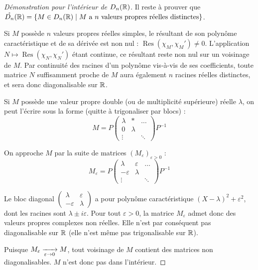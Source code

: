 \begin{proof}[Démonstration pour l'intérieur de $D_n(\mathbb{R})$]
    Il reste à prouver que $\mathring{D_n}(\mathbb{R}) = \{ M \in D_n(\mathbb{R}) \mid M \text{ a } n \text{ valeurs propres réelles distinctes} \}$.

    
    \svspace
    Si $M$ possède $n$ valeurs propres réelles simples, le résultant de son polynôme caractéristique et de sa dérivée est non nul : $\operatorname{Res}(\chi_M, \chi_M') \neq 0$.
    L'application $N \mapsto \operatorname{Res}(\chi_N, \chi_N')$ étant continue, ce résultant reste non nul sur un voisinage de $M$. Par continuité des racines d'un polynôme vis-à-vis de ses coefficients, toute matrice $N$ suffisamment proche de $M$ aura également $n$ racines réelles distinctes, et sera donc diagonalisable sur $\mathbb{R}$.
    
    
    \svspace
    Si $M$ possède une valeur propre double (ou de multiplicité supérieure) réelle $\lambda$, on peut l'écrire sous la forme (quitte à trigonaliser par blocs) :
    \[ M = P \begin{pmatrix} 
        \lambda & * & \dots \\ 
        0 & \lambda & \\ 
        \vdots & & \ddots 
    \end{pmatrix} P^{-1} \]
    
    On approche $M$ par la suite de matrices $(M_\varepsilon)_{\varepsilon > 0}$ :
    \[ M_\varepsilon = P \begin{pmatrix} 
        \lambda & \varepsilon & \dots \\ 
        -\varepsilon & \lambda & \\ 
        \vdots & & \ddots 
    \end{pmatrix} P^{-1} \]
    
    Le bloc diagonal $\begin{pmatrix} \lambda & \varepsilon \\ -\varepsilon & \lambda \end{pmatrix}$ a pour polynôme caractéristique $(X - \lambda)^2 + \varepsilon^2$, dont les racines sont $\lambda \pm i\varepsilon$. 
    Pour tout $\varepsilon > 0$, la matrice $M_\varepsilon$ admet donc des valeurs propres complexes non réelles. Elle n'est par conséquent pas diagonalisable sur $\mathbb{R}$ (elle n'est même pas trigonalisable sur $\mathbb{R}$).
    
    Puisque $M_\varepsilon \xrightarrow[\varepsilon \to 0]{} M$, tout voisinage de $M$ contient des matrices non diagonalisables. $M$ n'est donc pas dans l'intérieur.
\end{proof}

